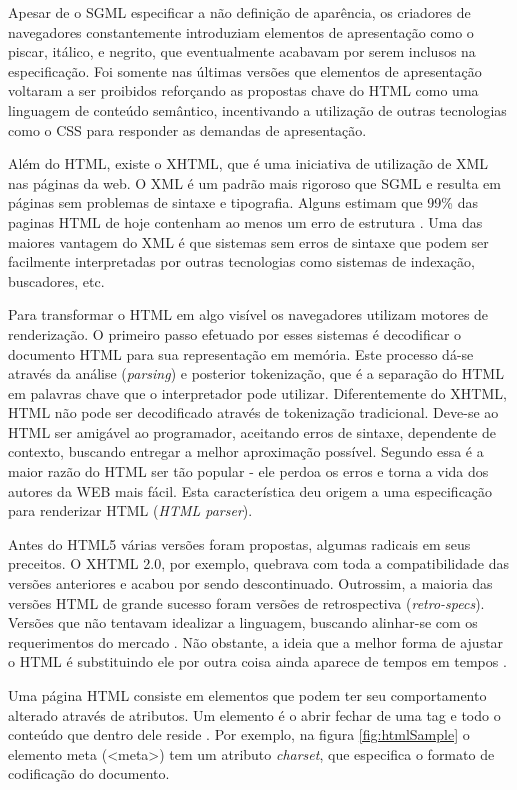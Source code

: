 Apesar de o SGML especificar a não definição de aparência, os criadores de
navegadores constantemente introduziam elementos de apresentação como o
piscar, itálico, e negrito, que eventualmente acabavam por serem inclusos
na especificação. Foi somente nas últimas versões que elementos de
apresentação voltaram a ser proibidos reforçando as propostas chave
do HTML como uma linguagem de conteúdo semântico, incentivando a
utilização de outras tecnologias como o CSS para responder as demandas de
apresentação.

Além do HTML, existe o XHTML, que é uma iniciativa de utilização de
XML nas páginas da web. O XML é um padrão mais rigoroso que SGML e
resulta em páginas sem problemas de sintaxe e tipografia. 
Alguns estimam que 99\% das paginas HTML de hoje
contenham ao menos um erro de estrutura \autocite{diveIntohtml}.
Uma das maiores vantagem do XML é que sistemas sem erros de sintaxe
que podem ser facilmente interpretadas por outras tecnologias como
sistemas de indexação, buscadores, etc.

Para transformar o HTML em algo visível os navegadores utilizam motores
de renderização. O primeiro passo efetuado por esses sistemas é
decodificar o documento HTML para sua representação em memória. Este
processo dá-se através da análise (\textit{parsing}) e posterior
tokenização, que é a separação do HTML em palavras chave que o
interpretador pode utilizar. Diferentemente do XHTML, HTML não pode
ser decodificado através de tokenização tradicional. Deve-se ao HTML
ser amigável ao programador, aceitando erros de sintaxe, dependente
de contexto, buscando entregar a melhor aproximação possível. 
Segundo \cite{howBrowsersWork} essa é a maior razão do HTML ser tão popular - 
ele perdoa os erros e torna a vida dos autores da WEB mais fácil. Esta
característica deu origem a uma especificação para renderizar HTML
(\textit{HTML parser}).

Antes do HTML5 várias versões foram propostas, algumas radicais
em seus preceitos. O XHTML 2.0, por exemplo, quebrava com toda
a compatibilidade das versões anteriores e acabou por sendo descontinuado.
Outrossim, a maioria das versões HTML de grande sucesso foram versões de
retrospectiva (\textit{retro-specs}). Versões que não tentavam
idealizar a linguagem, buscando alinhar-se com os requerimentos do
mercado \autocite{diveIntohtml}. Não obstante, a ideia que a melhor forma
de ajustar o HTML é substituindo ele por outra coisa ainda aparece de tempos
em tempos \autocite{diveIntohtml}.

Uma página HTML consiste em elementos que podem ter seu comportamento
alterado através de atributos. Um elemento é o abrir fechar de
uma tag e todo o conteúdo que dentro dele reside \autocite[pp.
10--11]{htmlAndCssDucket}. Por exemplo, na figura \ref{fig:htmlSample} o elemento
meta (<meta>) tem um atributo \textit{charset}, que especifica o formato de 
codificação do documento.

